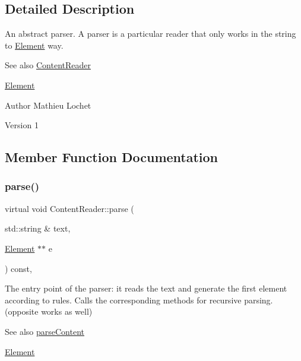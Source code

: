 \subsection{Detailed Description}
An abstract parser. A parser is a particular reader that only works in the string to \mbox{\hyperlink{classElement}{Element}} way. \begin{DoxySeeAlso}{See also}
\mbox{\hyperlink{classContentReader}{Content\+Reader}} 

\mbox{\hyperlink{classElement}{Element}}
\end{DoxySeeAlso}
\begin{DoxyAuthor}{Author}
Mathieu Lochet 
\end{DoxyAuthor}
\begin{DoxyVersion}{Version}
1 
\end{DoxyVersion}


\subsection{Member Function Documentation}
\mbox{\label{classContentReader_a7fff2e63a2e8fa216665604f69974e1d}} 
\subsubsection{\texorpdfstring{parse()}{parse()}}
{\footnotesize\ttfamily virtual void Content\+Reader\+::parse (\begin{DoxyParamCaption}\item[{std\+::string \&}]{text,  }\item[{\mbox{\hyperlink{classElement}{Element}} $\ast$$\ast$}]{e }\end{DoxyParamCaption}) const\hspace{0.3cm}{\ttfamily [pure virtual]}, {\ttfamily [inherited]}}

The entry point of the parser\+: it reads the text and generate the first element according to rules. Calls the corresponding methods for recursive parsing. (opposite works as well) \begin{DoxySeeAlso}{See also}
\mbox{\hyperlink{classContentReader_a7eef37b8b9761e21c0a3907ff94c72f7}{parse\+Content}} 

\mbox{\hyperlink{classElement}{Element}}
\end{DoxySeeAlso}

